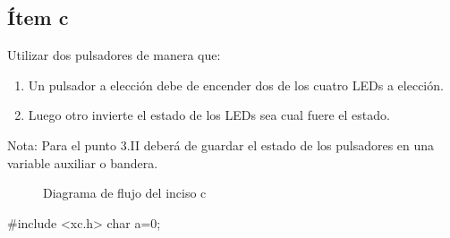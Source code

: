 \documentclass[12pt,a4paper]{article}
\begin{document}

\begin{pyglist}[caption={nombre del programa.c}] 
\end{pyglist}

\subsection*{Ítem c} Utilizar dos pulsadores de manera que:

\renewcommand{\labelenumi}{\Roman{enumi}.} %
\begin{enumerate}
	\item Un pulsador a elección debe de encender dos de los cuatro LEDs a elección.
	\item  Luego otro invierte el estado de los LEDs sea cual fuere el estado.
\end{enumerate}

Nota: Para el punto 3.II deberá de guardar el estado de los pulsadores en una variable auxiliar
o bandera.


\begin{figure} [H] %
	\centering
	\caption{Diagrama de flujo del inciso c}
	\label{fig:inciso_c}
\end{figure}



\begin{pyglist}[caption={nombre del programa.c}] 
	#include <xc.h>
	char a=0;
\end{pyglist}
\end{document}
